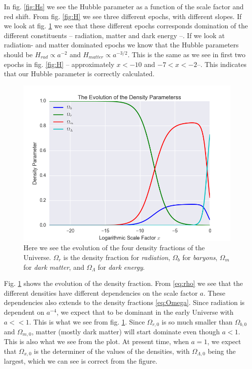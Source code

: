 \documentclass[a4paper,norsk, 10pt]{article}
\begin{document}
In fig. \ref{fig:Hs} we see the Hubble parameter as a function of the scale factor and red shift. From fig. \ref{fig:H} we see three different epochs, with different slopes. If we look at fig. \ref{fig:omega} we see that these different epochs corresponds domination of the different constituents -- radiation, matter and dark energy --. If we look at radiation- and matter dominated epochs we know that the Hubble parameters should be $H_{rad} \propto a^{-2}$ and $H_{matter} \propto a^{-3/2}$. This is the same as we see in first two epochs in fig. \ref{fig:H} -- approximately $x < -10$ and $-7<x<-2$--. This indicates that our Hubble parameter is correctly calculated.


\begin{figure}[ht]
     \centering
	{\includegraphics[scale=0.5]{Omega.png}
	\caption{Here we see the evolution of the four density fractions of the Universe. $\Omega_r$ is the density fraction for \textit{radiation}, $\Omega_b$ for \textit{baryons}, $\Omega_m$ for \textit{dark matter}, and $\Omega_{\Lambda}$ for \textit{dark energy}.}\label{fig:omega}}
\end{figure}



Fig. \ref{fig:omega} shows the evolution of the density fraction. From \eqref{eq:rho} we see that the different densities have different dependencies on the scale factor $a$. These dependencies also extends to the density fractions \eqref{eq:Omega}. Since radiation is dependent on $a^{-4}$, we expect that to be dominant in the early Universe with $a << 1$. This is what we see from fig. \ref{fig:omega}. Since $\Omega_{r,0}$ is so much smaller than $\Omega_{b,0}$ and $\Omega_{m,0}$, matter (mostly dark matter) will start dominate even though $a<1$. This is also what we see from the plot. At present time, when $a=1$, we expect that $\Omega_{x,0}$ is the determiner of the values of the densities, with $\Omega_{\Lambda,0}$ being the largest, which we can see is correct from the figure.
\end{document}
